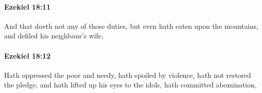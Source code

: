 		\paragraph{Ezekiel 18:11} %
			\label{EZEKIEL-18-11}

			And that doeth not any of those duties, but even hath eaten upon the mountains, and defiled his neighbour’s wife,


		\paragraph{Ezekiel 18:12} %
			\label{EZEKIEL-18-12}

			Hath oppressed the poor and needy, hath spoiled by violence, hath not restored the pledge, and hath lifted up his eyes to the idols, hath committed abomination,


